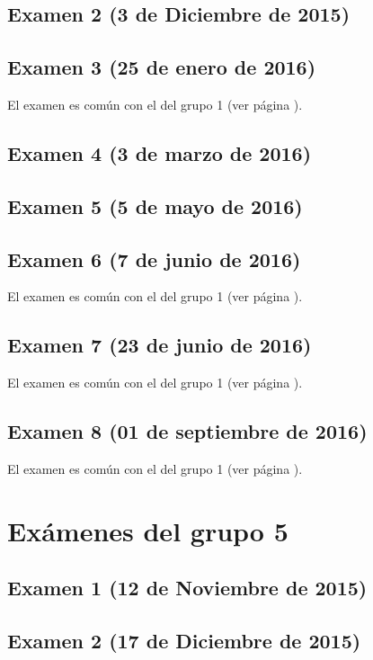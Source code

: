 \documentclass[a4paper,12pt,twoside]{book}
\begin{document}
\section{Examen 2 (3 de Diciembre de 2015)}
\section{Examen 3 (25 de enero de 2016)}
El examen es común con el del grupo 1 (ver página \pageref{examen_15_16_1_3}).
\section{Examen 4 (3 de marzo de 2016)}
\section{Examen 5 (5 de mayo de 2016)}
\section{Examen 6 (7 de junio de 2016)} 
El examen es común con el del grupo 1 (ver página \pageref{examen_15_16_1_6}).
\section{Examen 7 (23 de junio de 2016)}
El examen es común con el del grupo 1 (ver página \pageref{examen_15_16_1_7}).
\section{Examen 8 (01 de septiembre de 2016)}
El examen es común con el del grupo 1 (ver página \pageref{examen_15_16_1_8}).

\chapter{Exámenes del grupo 5}
\section{Examen 1 (12 de Noviembre de 2015)}
\section{Examen 2 (17 de Diciembre de 2015)}
\end{document}
